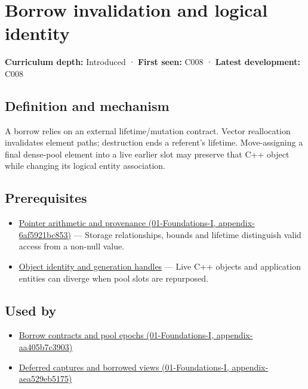 \hypertarget{appendix-f9b8b9188c7f}{}
\section{Borrow invalidation and logical identity}\label{appendix-f9b8b9188c7f-borrow-invalidation-and-logical-identity}

\textbf{Curriculum depth:} Introduced · \textbf{First seen:} C008 · \textbf{Latest development:} C008

\subsection{Definition and mechanism}\label{appendix-f9b8b9188c7f-definition-and-mechanism}

A borrow relies on an external lifetime/mutation contract. Vector reallocation invalidates element paths; destruction ends a referent's lifetime. Move-assigning a final dense-pool element into a live earlier slot may preserve that C++ object while changing its logical entity association.

\subsection{Prerequisites}\label{appendix-f9b8b9188c7f-prerequisites}

\begin{itemize}
\tightlist
\item
  \href{../01-Foundations-I/main.pdf\#nameddest=appendix-6af5921bc853}{Pointer arithmetic and provenance (01-Foundations-I, appendix-6af5921bc853)} --- Storage relationships, bounds and lifetime distinguish valid access from a non-null value.
\item
  \hyperref[appendix-f1581457d322]{Object identity and generation handles} --- Live C++ objects and application entities can diverge when pool slots are repurposed.
\end{itemize}

\subsection{Used by}\label{appendix-f9b8b9188c7f-used-by}

\begin{itemize}
\tightlist
\item
  \href{../01-Foundations-I/main.pdf\#nameddest=appendix-aa405b7c3903}{Borrow contracts and pool epochs (01-Foundations-I, appendix-aa405b7c3903)}
\item
  \href{../01-Foundations-I/main.pdf\#nameddest=appendix-aea529eb5175}{Deferred captures and borrowed views (01-Foundations-I, appendix-aea529eb5175)}
\end{itemize}

